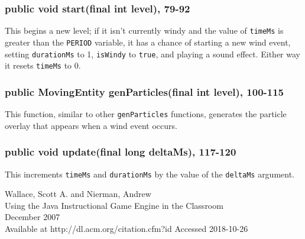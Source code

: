 \documentclass[12pt]{article}
\begin{document}
\subsubsection{public void start(final int level), 79-92}
This begins a new level; if it isn't currently windy and the value of \verb|timeMs| is greater than the \verb|PERIOD| variable, it has a chance of starting a new wind event, setting \verb|durationMs| to 1, \verb|isWindy| to \verb|true|, and playing a sound effect.
Either way it resets \verb|timeMs| to 0.

\subsubsection{public MovingEntity genParticles(final int level), 100-115}
This function, similar to other \verb|genParticles| functions, generates the particle overlay that appears when a wind event occurs.

\subsubsection{public void update(final long deltaMs), 117-120}
This increments \verb|timeMs| and \verb|durationMs| by the value of the \verb|deltaMs| argument.


\begin{thebibliography}{0}
    Wallace, Scott A. and Nierman, Andrew\\
    Using the Java Instructional Game Engine in the Classroom\\
    December 2007\\
    Available at http://dl.acm.org/citation.cfm?id
    Accessed 2018-10-26
\end{thebibliography}
\end{document}
